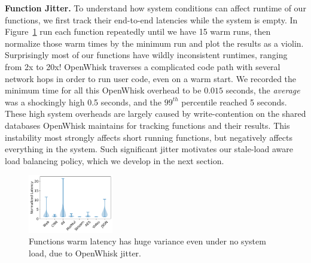 \noindent \textbf{Function Jitter.}
To understand how system conditions can affect runtime of our functions, we first track their end-to-end latencies while the system is empty. 
In Figure~\ref{fig:UnstableEmpty} run each function repeatedly until we have 15 warm runs, then normalize those warm times by the minimum run and plot the results as a violin.
Surprisingly most of our functions have wildly inconsistent runtimes, ranging from 2x to 20x!
OpenWhisk traverses a complicated code path with several network hops in order to run user code, even on a warm start. 
We recorded the minimum time for all this OpenWhisk overhead to be $0.015$ seconds, the \emph{average} was a shockingly high 0.5 seconds, and the $99^{th}$ percentile reached 5 seconds. 
These high system overheads are largely caused by write-contention on the shared databases OpenWhisk maintains for tracking functions and their results. 
This instability most strongly affects short running functions, but negatively affects everything in the system.
Such significant jitter motivates our stale-load aware load balancing policy, which we develop in the next section. 



\begin{figure}
  \includegraphics[width=0.33\textwidth]{../figs/ow/function_breakdown_min.pdf}
  \vspace*{-0.25cm}
  \caption{Functions warm latency has huge variance even under no system load, due to OpenWhisk jitter.}
  \label{fig:UnstableEmpty}
    \vspace*{-0.25cm}
\end{figure}


